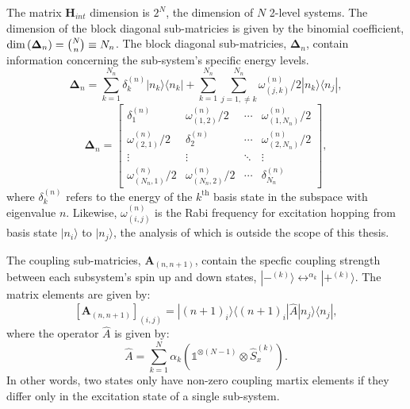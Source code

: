 The matrix $\mathbf{H}_{int}$ dimension is $2^N$, the dimension of $N$ 2-level systems.
The dimension of the block diagonal sub-matricies is given by the binomial coefficient, $\textrm{dim}\left( \mathbf{\Delta}_n \right) = \tbinom N{n} \equiv N_{n}$.
The block diagonal sub-matricies, $\mathbf{\Delta}_{n}$, contain information concerning the sub-system's specific energy levels.
\begin{equation}
  \label{eqn_bdsubmatricieselem}
  \mathbf{\Delta}_{n} = \sum_{k=1}^{N_{n}}\delta_{k}^{(n)} |n_k\rangle\langle n_k| +
  \sum_{k=1}^{N_{n}}\sum_{j=1,\neq k}^{N_{n}}\omega_{(j,k)}^{(n)}/2|n_k\rangle\langle n_j|,
\end{equation}
\begin{equation}
  \label{eqn_bdsubmatricies}
  \mathbf{\Delta}_{n} = \begin{bmatrix}
    \delta^{(n)}_1 & \omega^{(n)}_{(1,2)}/2 & \cdots & \omega^{(n)}_{(1,{N_{n}})}/2 \\
    \omega^{(n)}_{(2,1)}/2  & \delta^{(n)}_2 & \cdots & \omega^{(n)}_{(2,{N_{n}})}/2 \\
    \vdots                  & \vdots                    & \ddots & \vdots         \\
    \omega^{(n)}_{({N_{n}},1)}/2  & \omega^{(n)}_{({N_{n}},2)}/2    & \cdots & \delta^{(n)}_{N_n}

  \end{bmatrix},
\end{equation}
where $\delta^{(n)}_k$ refers to the energy of the $k^{\mathrm{th}}$ basis state in the subspace with eigenvalue $n$.
Likewise, $\omega^{(n)}_{(i,j)}$ is the Rabi frequency for excitation hopping from basis state $|n_i\rangle$ to $|n_j\rangle$, the analysis of which is outside the scope of this thesis.

The coupling sub-matricies, $\mathbf{A}_{(n,n +1)}$, contain the specfic coupling strength between each subsystem's spin up and down states, $|-^{(k)}\rangle \leftrightarrow^{\alpha_k} |+^{(k)}\rangle$.
The matrix elements are given by:
\begin{equation}
  \label{eqn_couplingsubmatricies}
  \left[\mathbf{A}_{(n,n +1)}\right]_{(i,j)} = |(n +1)_i\rangle\langle (n +1)_i|\hat{A}|n_j\rangle\langle n_j|,
\end{equation}
where the operator $\hat{A}$ is given by:
\begin{equation}
  \label{eqn_aop}
  \hat{A} = \sum_{k=1}^{N} \alpha_k \left( \mathds{1}^{\otimes (N-1)} \otimes \hat{S}_x^{(k)}\right).
\end{equation}
In other words, two states only have non-zero coupling martix elements if they differ only in the excitation state of a single sub-system.

